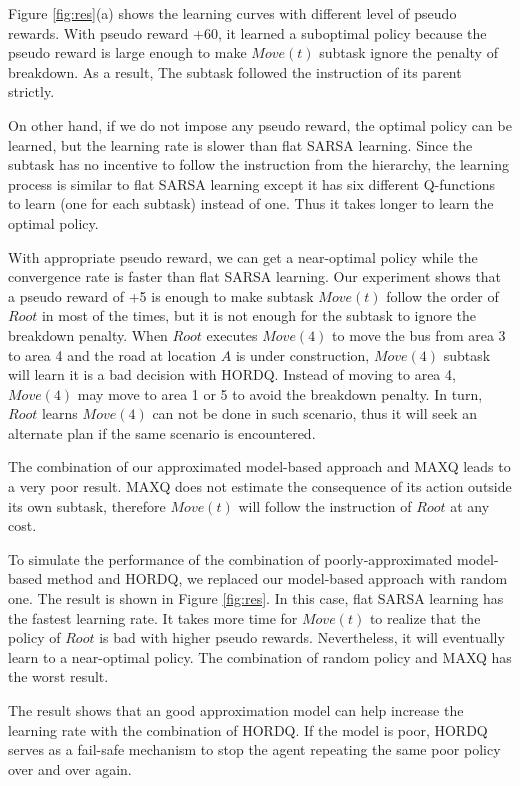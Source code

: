 \documentclass{article} %
\begin{document}
Figure \ref{fig:res}(a) shows the learning curves with different level of pseudo rewards.
With pseudo reward +60, it learned a suboptimal policy because
the pseudo reward is large enough to make $Move(t)$ subtask ignore 
the penalty of breakdown. As a result, The subtask followed 
the instruction of its parent strictly.

On other hand, if we do not impose any pseudo reward, 
the optimal policy can be learned, but the learning rate is
slower than flat SARSA learning. Since the subtask has no
incentive to follow the instruction from the hierarchy, 
the learning process is similar to flat SARSA learning 
except it has six different Q-functions to learn (one for each subtask) instead of one.
Thus it takes longer to learn the optimal policy. 

With appropriate pseudo reward, we can get a near-optimal policy
while the convergence rate is faster than flat SARSA learning.
Our experiment shows that a pseudo reward of +5 is enough to make subtask $Move(t)$ follow 
the order of $Root$ in most of the times, but it is not enough for the subtask to ignore
the breakdown penalty. When $Root$ executes $Move(4)$ to move the bus from area 
3 to area 4 and the road at location $A$ is under construction, $Move(4)$ subtask
will learn it is a bad decision with HORDQ.
Instead of moving to area 4, $Move(4)$ may move to area 1 or 5 to avoid
the breakdown penalty. In turn, $Root$ learns $Move(4)$ can not be done in 
such scenario, thus it will seek an alternate plan if the same scenario
is encountered.

The combination of our approximated model-based approach and MAXQ leads 
to a very poor result. MAXQ does not estimate the consequence of its action outside its own subtask, therefore
$Move(t)$ will follow the instruction of $Root$ at any cost.

To simulate the performance of the combination of poorly-approximated model-based method and 
HORDQ, we replaced our model-based approach with random one.
The result is shown in Figure \ref{fig:res}. In this case, flat SARSA learning has the fastest
learning rate. It takes more time for $Move(t)$ to realize that the policy of $Root$ is bad with higher pseudo rewards.
Nevertheless, it will eventually learn to a near-optimal policy.
The combination of random policy and MAXQ has the worst result.

The result shows that an good approximation model 
can help increase the learning rate with the combination of HORDQ. 
If the model is poor, HORDQ serves as a fail-safe mechanism to stop 
the agent repeating the same poor policy over and over again.
\end{document}
